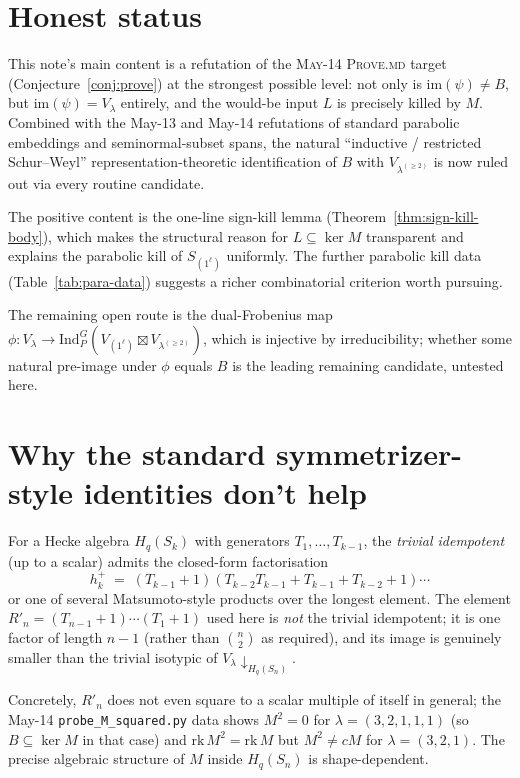 \documentclass[11pt]{article}
\theoremstyle{definition}
\begin{document}
\section{Honest status}\label{sec:status}

This note's main content is a refutation of the \textsc{May-14
Prove.md} target (Conjecture~\ref{conj:prove}) at the strongest
possible level: not only is $\mathrm{im}(\psi) \ne B$, but
$\mathrm{im}(\psi) = V_\lambda$ entirely, and the would-be input $L$
is precisely killed by $M$. Combined with the May-13 and May-14
refutations of standard parabolic embeddings and seminormal-subset
spans, the natural ``inductive / restricted Schur--Weyl''
representation-theoretic identification of $B$ with $V_{\lambda^{(\ge
2)}}$ is now ruled out via every routine candidate.

The positive content is the one-line sign-kill lemma
(Theorem~\ref{thm:sign-kill-body}), which makes the structural reason
for $L \subseteq \ker M$ transparent and explains the parabolic
kill of $S_{(1^\ell)}$ uniformly. The further parabolic kill data
(Table~\ref{tab:para-data}) suggests a richer combinatorial criterion
worth pursuing.

The remaining open route is the dual-Frobenius map $\phi: V_\lambda
\to \mathrm{Ind}_P^G(V_{(1^\ell)} \boxtimes V_{\lambda^{(\ge 2)}})$,
which is injective by irreducibility; whether some natural pre-image
under $\phi$ equals $B$ is the leading remaining candidate, untested
here.

\appendix
\section{Why the standard symmetrizer-style identities don't help}\label{app:why-not}

For a Hecke algebra $H_q(S_k)$ with generators $T_1, \ldots, T_{k-1}$,
the \emph{trivial idempotent} (up to a scalar) admits the closed-form
factorisation
\[
   h_k^+ \;=\; (T_{k-1}+1)(T_{k-2} T_{k-1} + T_{k-1} + T_{k-2} + 1) \cdots
\]
or one of several Matsumoto-style products over the longest element.
The element $R'_n = (T_{n-1}+1)\cdots(T_1+1)$ used here is \emph{not}
the trivial idempotent; it is one factor of length $n - 1$ (rather
than $\binom{n}{2}$ as required), and its image is genuinely smaller
than the trivial isotypic of $V_\lambda \!\downarrow_{H_q(S_n)}$.

Concretely, $R'_n$ does not even square to a scalar multiple of
itself in general; the May-14 \texttt{probe\_M\_squared.py} data
shows $M^2 = 0$ for $\lambda = (3,2,1,1,1)$ (so $B \subseteq \ker M$
in that case) and $\mathrm{rk}\,M^2 = \mathrm{rk}\,M$ but $M^2 \ne c
M$ for $\lambda = (3,2,1)$. The precise algebraic structure of $M$
inside $H_q(S_n)$ is shape-dependent.
\end{document}
